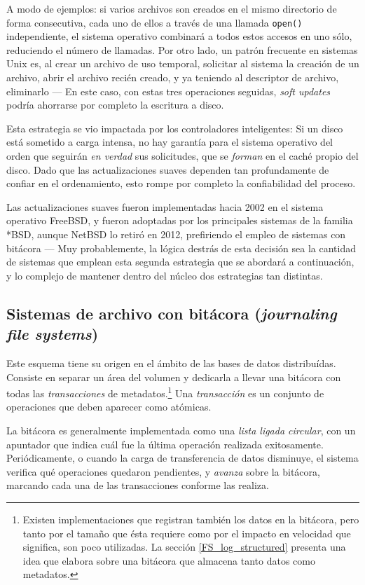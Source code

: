 \documentclass[11pt,fleqn]{book} %
\begin{document}
A modo de ejemplos: si varios archivos son creados en el mismo
directorio de forma consecutiva, cada uno de ellos a través de una
llamada \texttt{open()} independiente, el sistema operativo combinará a todos
estos accesos en uno sólo, reduciendo el número de llamadas. Por otro
lado, un patrón frecuente en sistemas Unix es, al crear un archivo de
uso temporal, solicitar al sistema la creación de un archivo, abrir el
archivo recién creado, y ya teniendo al descriptor de archivo,
eliminarlo — En este caso, con estas tres operaciones seguidas, \emph{soft updates} podría ahorrarse por completo la escritura a disco.

Esta estrategia se vio impactada por los controladores inteligentes:
Si un disco está sometido a carga intensa, no hay garantía para el
sistema operativo del orden que seguirán \emph{en verdad} sus solicitudes,
que se \emph{forman} en el caché propio del disco. Dado que las
actualizaciones suaves dependen tan profundamente de confiar en el
ordenamiento, esto rompe por completo la confiabilidad del proceso.

Las actualizaciones suaves fueron implementadas hacia 2002 en el sistema operativo
FreeBSD, y fueron adoptadas por los principales sistemas de la
familia *BSD, aunque NetBSD lo retiró en 2012, prefiriendo el empleo
de sistemas con bitácora — Muy probablemente, la lógica destrás de
esta decisión sea la cantidad de sistemas que emplean esta segunda
estrategia que se abordará a continuación, y lo complejo de mantener
dentro del núcleo dos estrategias tan distintas.
\subsection{Sistemas de archivo con bitácora (\emph{journaling file systems})}
\label{sec-7-3-4}


Este esquema tiene su origen en el ámbito de las bases de datos
distribuídas. Consiste en separar un área del volumen y dedicarla a
llevar una bitácora con todas las \emph{transacciones} de metadatos.\footnote{Existen implementaciones que registran también los datos en la
bitácora, pero tanto por el tamaño que ésta requiere como por el
impacto en velocidad que significa, son poco utilizadas. La sección
\ref{FS_log_structured} presenta una idea que elabora sobre una
bitácora que almacena tanto datos como metadatos. } Una \emph{transacción}
es un conjunto de operaciones que deben aparecer como atómicas.

La bitácora es generalmente implementada como una \emph{lista ligada circular}, con un apuntador que indica cuál fue la última operación
realizada exitosamente. Periódicamente, o cuando la carga de
transferencia de datos disminuye, el sistema verifica qué operaciones
quedaron pendientes, y \emph{avanza} sobre la bitácora, marcando cada una
de las transacciones conforme las realiza.
\end{document}
